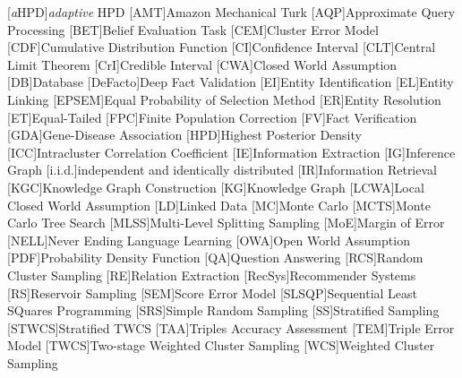 [\textit{a}HPD]{\textit{adaptive} HPD}
[AMT]{Amazon Mechanical Turk}
[AQP]{Approximate Query Processing}
[BET]{Belief Evaluation Task}
[CEM]{Cluster Error Model}
[CDF]{Cumulative Distribution Function}
[CI]{Confidence Interval}
[CLT]{Central Limit Theorem}
[CrI]{Credible Interval}
[CWA]{Closed World Assumption}
[DB]{Database}
[DeFacto]{Deep Fact Validation}
[EI]{Entity Identification}
[EL]{Entity Linking}
[EPSEM]{Equal Probability of Selection Method}
[ER]{Entity Resolution}
[ET]{Equal-Tailed}
[FPC]{Finite Population Correction}
[FV]{Fact Verification}
[GDA]{Gene-Disease Association}
[HPD]{Highest Posterior Density}
[ICC]{Intracluster Correlation Coefficient}
[IE]{Information Extraction}
[IG]{Inference Graph}
[i.i.d.]{independent and identically distributed}
[IR]{Information Retrieval}
[KGC]{Knowledge Graph Construction}
[KG]{Knowledge Graph}
[LCWA]{Local Closed World Assumption}
[LD]{Linked Data}
[MC]{Monte Carlo}
[MCTS]{Monte Carlo Tree Search}
[MLSS]{Multi-Level Splitting Sampling}
[MoE]{Margin of Error}
[NELL]{Never Ending Language Learning}
[OWA]{Open World Assumption}
[PDF]{Probability Density Function}
[QA]{Question Answering}
[RCS]{Random Cluster Sampling}
[RE]{Relation Extraction}
[RecSys]{Recommender Systems}
[RS]{Reservoir Sampling}
[SEM]{Score Error Model}
[SLSQP]{Sequential Least SQuares Programming}
[SRS]{Simple Random Sampling}
[SS]{Stratified Sampling}
[STWCS]{Stratified TWCS}
[TAA]{Triples Accuracy Assessment}
[TEM]{Triple Error Model}
[TWCS]{Two-stage Weighted Cluster Sampling}
[WCS]{Weighted Cluster Sampling}